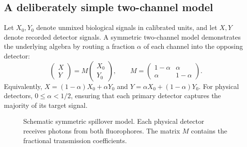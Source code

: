 \subsection{A deliberately simple two-channel model}
\label{subsec:l05-mixing}
Let $X_0, Y_0$ denote unmixed biological signals in calibrated units, and let $X, Y$ denote recorded detector signals. A symmetric two-channel model demonstrates the underlying algebra by routing a fraction $\alpha$ of each channel into the opposing detector:
\begin{equation}
\begin{pmatrix}X\\Y\end{pmatrix}
=M\begin{pmatrix}X_0\\Y_0\end{pmatrix},
\qquad M=\begin{pmatrix}1-\alpha&\alpha\\\alpha&1-\alpha\end{pmatrix}.
\label{eq:l05-mixing-matrix}
\end{equation}
Equivalently, $X=(1-\alpha)X_0+\alpha Y_0$ and $Y=\alpha X_0+(1-\alpha)Y_0$. For physical detectors, $0\leq\alpha<1/2$, ensuring that each primary detector captures the majority of its target signal.

\begin{figure}[htbp]
\centering
{}
\caption{Schematic symmetric spillover model. Each physical detector receives photons from both fluorophores. The matrix $M$ contains the fractional transmission coefficients.}
\label{fig:l05-spillover}
\end{figure}


